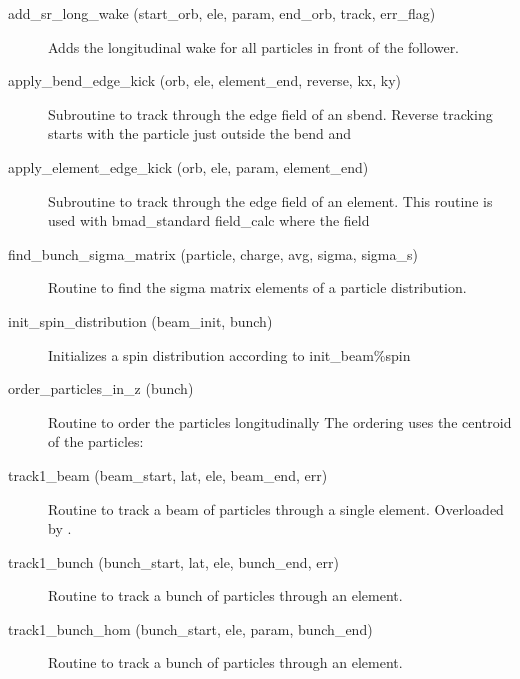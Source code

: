 \begin{description}

\label{r:add.sr.long.wake}
\item[add_sr_long_wake (start_orb, ele, param, end_orb, track, err_flag)] \Newline 
Adds the longitudinal wake for all particles in front of the follower.

\label{r:apply.bend.edge.kick}
\item[apply_bend_edge_kick (orb, ele, element_end, reverse, kx, ky)] \Newline 
Subroutine to track through the edge field of an sbend.
Reverse tracking starts with the particle just outside the bend and

\label{r:apply.element.edge.kick}
\item[apply_element_edge_kick (orb, ele, param, element_end)] \Newline 
Subroutine to track through the edge field of an element.
This routine is used with bmad_standard field_calc where the field

\label{r:find.bunch.sigma.matrix}
\item[find_bunch_sigma_matrix (particle, charge, avg, sigma, sigma_s)] \Newline 
Routine to find the sigma matrix elements of a particle distribution.

\label{r:init.spin.distribution}
\item[init_spin_distribution (beam_init, bunch)] \Newline 
Initializes a spin distribution according to init_beam\%spin

\label{r:order.particles.in.z}
\item[order_particles_in_z (bunch)] \Newline 
Routine to order the particles longitudinally 
The ordering uses the centroid of the particles:

\label{r:track1.beam}
\item[track1_beam (beam_start, lat, ele, beam_end, err)] \Newline 
Routine to track a beam of particles through a single element.
Overloaded by .

\label{r:track1.bunch}
\item[track1_bunch (bunch_start, lat, ele, bunch_end, err)] \Newline 
Routine to track a bunch of particles through an element.

\label{r:track1.bunch.hom}
\item[track1_bunch_hom (bunch_start, ele, param, bunch_end)] \Newline 
Routine to track a bunch of particles through an element.

\end{description}

